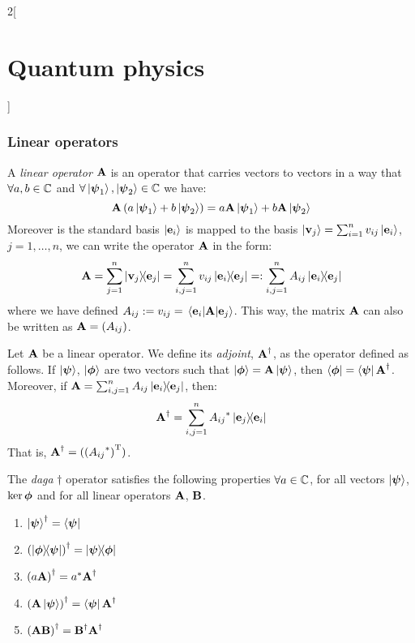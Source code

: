 \documentclass[../../../main_physics.tex]{subfiles}
\begin{document}
\begin{multicols}{2}[\section{Quantum physics}]
  \subsubsection{Linear operators}
  \begin{definition}
    A \emph{linear operator} $\boldsymbol{\mathrm{A}}$ is an operator that carries vectors to vectors in a way that $\forall a,b\in\mathbb{C}$ and $\forall \ket{\boldsymbol{\mathrm{\psi}}_1},\ket{\boldsymbol{\mathrm{\psi}}_2}\in \mathbb{C}$ we have: $$\boldsymbol{\mathrm{A}}\left(a\ket{\boldsymbol{\mathrm{\psi}}_1}+b\ket{\boldsymbol{\mathrm{\psi}}_2}\right)=a\boldsymbol{\mathrm{A}}\ket{\boldsymbol{\mathrm{\psi}}_1}+b\boldsymbol{\mathrm{A}}\ket{\boldsymbol{\mathrm{\psi}}_2}$$
    Moreover is the standard basis $\ket{\boldsymbol{\mathrm{e}}_i}$ is mapped to the basis $\ket{\boldsymbol{\mathrm{v}}_j}=\sum_{i=1}^nv_{ij}\ket{\boldsymbol{\mathrm{e}}_i}$, $j=1,\ldots,n$, we can write the operator $\boldsymbol{\mathrm{A}}$ in the form: $$\vf{A}=\sum_{j=1}^n\dyad{\vf{v}_j}{\vf{e}_j}=\sum_{i,j=1}^nv_{ij}\dyad{\vf{e}_i}{\vf{e}_j}=:\sum_{i,j=1}^nA_{ij}\dyad{\vf{e}_i}{\vf{e}_j}$$ where we have defined $A_{ij}:=v_{ij}=\mel{\boldsymbol{\mathrm{e}}_i}{\boldsymbol{\mathrm{A}}}{\boldsymbol{\mathrm{e}}_j}$. This way, the matrix $\boldsymbol{\mathrm{A}}$ can also be written as $\boldsymbol{\mathrm{A}}=(A_{ij})$.
  \end{definition}
  \begin{definition}
    Let $\boldsymbol{\mathrm{A}}$ be a linear operator. We define its \emph{adjoint}, $\boldsymbol{\mathrm{A}}^\dag$, as the operator defined as follows. If $\ket{\boldsymbol{\mathrm{\psi}}}$, $\ket{\boldsymbol{\mathrm{\phi}}}$ are two vectors such that $\ket{\boldsymbol{\mathrm{\phi}}}=\boldsymbol{\mathrm{A}}\ket{\boldsymbol{\mathrm{\psi}}}$, then $\bra{\boldsymbol{\mathrm{\phi}}}=\bra{\boldsymbol{\mathrm{\psi}}}\boldsymbol{\mathrm{A}}^\dag$. Moreover, if $\vf{A}=\sum_{i,j=1}^nA_{ij}\dyad{\vf{e}_i}{\vf{e}_j}$, then: $$\vf{A}^\dag=\sum_{i,j=1}^n{A_{ij}}^*\dyad{\vf{e}_j}{\vf{e}_i}$$ That is, $\boldsymbol{\mathrm{A}}^\dag=({({A_{ij}}^*)}^{\mathrm{T}})$.
  \end{definition}
  \begin{proposition}
    The \emph{daga} $\dag$ operator satisfies the following properties $\forall a\in\mathbb{C}$, for all vectors $\ket{\boldsymbol{\mathrm{\psi}}}$, $\ker{\boldsymbol{\mathrm{\phi}}}$ and for all linear operators $\boldsymbol{\mathrm{A}}$, $\boldsymbol{\mathrm{B}}$.
    \begin{enumerate}
      \item ${\ket{\boldsymbol{\mathrm{\psi}}}}^\dag=\bra{\boldsymbol{\mathrm{\psi}}}$
      \item ${(\dyad{\vf\phi}{\vf\psi})}^\dag=\dyad{\vf\psi}{\vf\phi}$
      \item ${(a\boldsymbol{\mathrm{A}})}^\dag=a^*\boldsymbol{\mathrm{A}}^\dag$
      \item ${(\boldsymbol{\mathrm{A}}\ket{\boldsymbol{\mathrm{\psi}}})}^\dag=\bra{\boldsymbol{\mathrm{\psi}}}\boldsymbol{\mathrm{A}}^\dag$
      \item ${(\boldsymbol{\mathrm{AB}})}^\dag=\boldsymbol{\mathrm{B}}^\dag\boldsymbol{\mathrm{A}}^\dag$
    \end{enumerate}
  \end{proposition}
  \begin{definition}

\end{definition}
\end{multicols}
\end{document}
